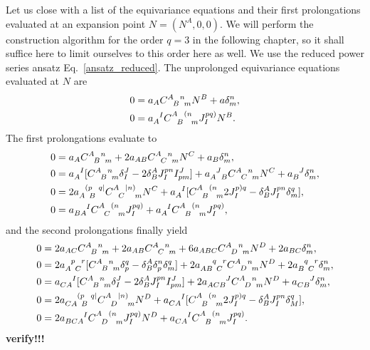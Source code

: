 Let us close with a list of the equivariance equations and their first prolongations evaluated at an expansion point $N = (N^A,0,0)$. We will perform the construction algorithm for the order $q=3$ in the following chapter, so it shall suffice here to limit ourselves to this order here as well. We use the reduced power series ansatz Eq.~\ref{ansatz_reduced}. The unprolonged equivariance equations evaluated at $N$ are
\begin{equation}\label{prolong_0}
  \begin{aligned}
    0 &{} = a_A \gmc{A}{B}{n}{m} N^B + a \delta^n_m, \\
    0 &{} = a_A^{\hphantom AI}\gmc{A}{B}{(n}{m} J^{pq)}_I N^B.
  \end{aligned}
\end{equation}
The first prolongations evaluate to
\begin{equation}
  \begin{aligned}
    0 &{} = a_A \gmc{A}{B}{n}{m} + 2 a_{AB} \gmc{A}{C}{n}{m} N^C + a_B \delta^n_m, \\
    0 &{} = a_A^{\hphantom AI}\lbrack \gmc{A}{B}{n}{m} \delta^J_I - 2\delta^A_B J^{pn}_I I^J_{pm}\rbrack + a_{A\hphantom JB}^{\hphantom AJ}\gmc{A}{C}{n}{m} N^C + a_B^{\hphantom BJ} \delta^n_m, \\
    0 &{} = 2a_{A \hphantom pB}^{\hphantom A(p\hphantom Bq\mid} \gmc{A}{C}{\mid n)}{m} N^C + a_A^{\hphantom AI}\lbrack \gmc{A}{B}{(n}{m} 2J^{p)q}_I - \delta^A_B J^{pn}_I \delta^q_m\rbrack, \\
    0 &{} = a_{BA}^{\hphantom{BA}I} \gmc{A}{C}{(n}{m} J^{pq)}_I + a_A^{\hphantom AI}\gmc{A}{B}{(n}{m} J^{pq)}_I,
  \end{aligned}
\end{equation}
and the second prolongations finally yield
\begin{equation}
  \begin{aligned}
    0 &{} = 2 a_{AC} \gmc{A}{B}{n}{m} + 2 a_{AB} \gmc{A}{C}{n}{m} + 6 a_{ABC} \gmc{A}{D}{n}{m}N^D + 2a_{BC}\delta^n_m, \\
    0 &{} = 2 a_{A\hphantom pC}^{\hphantom Ap\hphantom Cr}\lbrack \gmc{A}{B}{n}{m} \delta^q_p - \delta^A_B\delta^n_p\delta^q_m \rbrack + 2a_{AB\hphantom qC}^{\hphantom{AB}q\hphantom Cr}\gmc{A}{D}{n}{m} N^D + 2a_{B\hphantom qC}^{\hphantom Bq\hphantom Cr}\delta^n_m, \\
    0 &{} = a_{CA}^{\hphantom{CA}I} \lbrack \gmc{A}{B}{n}{m} \delta^J_I - 2 \delta^A_B J^{pn}_I I^J_{pm} \rbrack + 2 a_{ACB}^{\hphantom{ACB}J} \gmc{A}{D}{n}{m} N^D + a_{CB}^{\hphantom{CB}J} \delta^n_m, \\
    0 &{} = 2a_{CA\hphantom{p}B}^{\hphantom{CA}(p\hphantom Bq\mid}\gmc{A}{D}{\mid n)}{m}N^D + a_{CA}^{\hphantom{CA}I} \lbrack \gmc{A}{B}{(n}{m} 2 J^{p)q}_I - \delta^A_B J^{pn}_I \delta^q_M \rbrack, \\
    0 &{} = 2a_{BCA}^{\hphantom{BCA}I} \gmc{A}{D}{(n}{m}J^{pq)}_I N^D + a_{CA}^{\hphantom{CA}I} \gmc{A}{B}{(n}{m} J^{pq)}_I.
  \end{aligned}
\end{equation}
\textbf{verify!!!}
